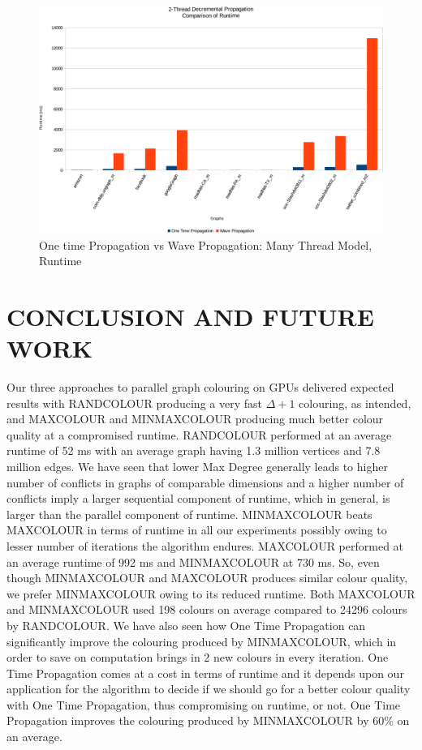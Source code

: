 \documentclass[MTech]{iitmdiss}
\begin{document}
\begin{figure}[h]
    \centering
    \includegraphics[width=\textwidth,keepaspectratio=true]{chartNewest37.pdf}
    \caption{
        One time Propagation vs Wave Propagation: Many Thread Model, Runtime
    }
    \label{fig:chart31}
\end{figure}

\chapter{CONCLUSION AND FUTURE WORK}
Our three approaches to parallel graph colouring on GPUs delivered expected results with RANDCOLOUR producing a very fast $\Delta+1$ colouring, as intended, and MAXCOLOUR and MINMAXCOLOUR producing much better colour quality at a compromised runtime. RANDCOLOUR performed at an average runtime of 52 ms with an average graph having 1.3 million vertices and 7.8 million edges. We have seen that lower Max Degree generally leads to higher number of conflicts in graphs of comparable dimensions and a higher number of conflicts imply a larger sequential component of runtime, which in general, is larger than the parallel component of runtime. MINMAXCOLOUR beats MAXCOLOUR in terms of runtime in all our experiments possibly owing to lesser number of iterations the algorithm endures. MAXCOLOUR performed at an average runtime of 992 ms and MINMAXCOLOUR at 730 ms. So, even though MINMAXCOLOUR and MAXCOLOUR produces similar colour quality, we prefer MINMAXCOLOUR owing to its reduced runtime. Both MAXCOLOUR and MINMAXCOLOUR used 198 colours on average compared to 24296 colours by RANDCOLOUR. We have also seen how One Time Propagation can significantly improve the colouring produced by MINMAXCOLOUR, which in order to save on computation brings in 2 new colours in every iteration. One Time Propagation comes at a cost in terms of runtime and it depends upon our application for the algorithm to decide if we should go for a better colour quality with One Time Propagation, thus compromising on runtime, or not. One Time Propagation improves the colouring produced by MINMAXCOLOUR by 60\% on an average.
\end{document}
